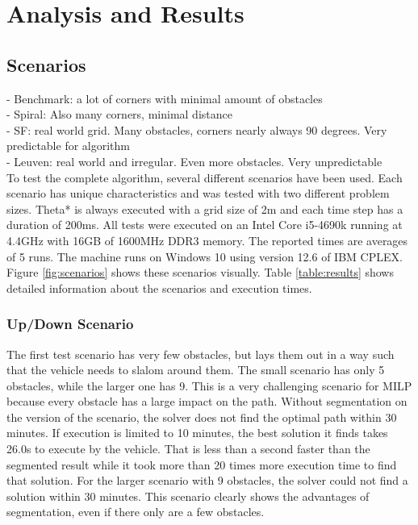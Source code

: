 \section{Analysis and Results}
\label{section:analysis}

\subsection{Scenarios}
- Benchmark: a lot of corners with minimal amount of obstacles\\
- Spiral: Also many corners, minimal distance\\
- SF: real world grid. Many obstacles, corners nearly always 90 degrees. Very predictable for algorithm\\
- Leuven: real world and irregular. Even more obstacles. Very unpredictable\\

To test the complete algorithm, several different scenarios have been used. Each scenario has unique characteristics and was tested with two different problem sizes. Theta* is always executed with a grid size of 2m and each time step has a duration of 200ms. All tests were executed on an Intel Core i5-4690k running at 4.4GHz with 16GB of 1600MHz DDR3 memory. The reported times are averages of 5 runs. The machine runs on Windows 10 using version 12.6 of IBM CPLEX. Figure \ref{fig:scenarios} shows these scenarios visually. Table \ref{table:results} shows detailed information about the scenarios and execution times.

\subsubsection{Up/Down Scenario}
The first test scenario has very few obstacles, but lays them out in a way such that the vehicle needs to slalom around them. The small scenario has only 5 obstacles, while the larger one has 9. This is a very challenging scenario for MILP because every obstacle has a large impact on the path. Without segmentation on the version of the scenario, the solver does not find the optimal path within 30 minutes. If execution is limited to 10 minutes, the best solution it finds takes 26.0s to execute by the vehicle. That is less than a second faster than the segmented result while it took more than 20 times more execution time to find that solution. For the larger scenario with 9 obstacles, the solver could not find a solution within 30 minutes. This scenario clearly shows the advantages of segmentation, even if there only are a few obstacles.

